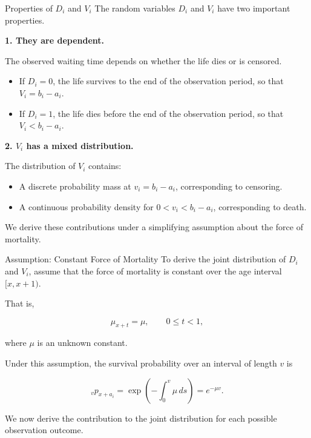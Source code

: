 \documentclass[
  ignorenonframetext,
  aspectratio=169,
]{beamer}
\providecommand{\tightlist}{%
  \setlength{\itemsep}{0pt}\setlength{\parskip}{0pt}}
\begin{document}
\begin{frame}{Properties of \(D_i\) and \(V_i\)}
\protect{}\label{properties-of-d_i-and-v_i}
The random variables \(D_i\) and \(V_i\) have two important properties.

\textbf{1. They are dependent.}

The observed waiting time depends on whether the life dies or is
censored.

\begin{itemize}
\tightlist
\item
  If \(D_i=0\), the life survives to the end of the observation period,
  so that \(V_i=b_i-a_i\).
\item
  If \(D_i=1\), the life dies before the end of the observation period,
  so that \(V_i<b_i-a_i\).
\end{itemize}

\textbf{2. \(V_i\) has a mixed distribution.}

The distribution of \(V_i\) contains:

\begin{itemize}
\tightlist
\item
  A discrete probability mass at \(v_i=b_i-a_i\), corresponding to
  censoring.
\item
  A continuous probability density for \(0<v_i<b_i-a_i\), corresponding
  to death.
\end{itemize}

We derive these contributions under a simplifying assumption about the
force of mortality.
\end{frame}

\begin{frame}{Assumption: Constant Force of Mortality}
\protect{}\label{assumption-constant-force-of-mortality}
To derive the joint distribution of \(D_i\) and \(V_i\), assume that the
force of mortality is constant over the age interval \([x,x+1)\).

That is,

\[
\mu_{x+t}=\mu,
\qquad 0\leq t<1,
\]

where \(\mu\) is an unknown constant.

Under this assumption, the survival probability over an interval of
length \(v\) is

\[
{}_vp_{x+a_i}
=
\exp\left(-\int_0^v \mu\,ds\right)
=
e^{-\mu v}.
\]

We now derive the contribution to the joint distribution for each
possible observation outcome.
\end{frame}
\end{document}
